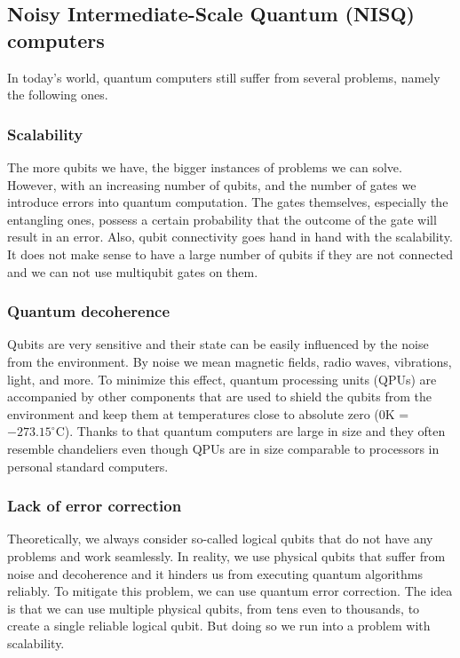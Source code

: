 \subsection{Noisy Intermediate-Scale Quantum (NISQ) computers}
In today's world, quantum computers still suffer from several problems, namely the following ones.

\subsubsection{Scalability}
The more qubits we have, the bigger instances of problems we can solve. However, with an increasing number of qubits, and the number of gates we introduce errors into quantum computation. The gates themselves, especially the entangling ones, possess a certain probability that the outcome of the gate will result in an error. Also, qubit connectivity goes hand in hand with the scalability. It does not make sense to have a large number of qubits if they are not connected and we can not use multiqubit gates on them.

\subsubsection{Quantum decoherence}
Qubits are very sensitive and their state can be easily influenced by the noise from the environment. By noise we mean magnetic fields, radio waves, vibrations, light, and more. To minimize this effect, quantum processing units (QPUs) are accompanied by other components that are used to shield the qubits from the environment and keep them at temperatures close to absolute zero ($0$K = $-273.15^{\circ}$C). Thanks to that quantum computers are large in size and they often resemble chandeliers even though QPUs are in size comparable to processors in personal standard computers.

\subsubsection{Lack of error correction}
Theoretically, we always consider so-called logical qubits that do not have any problems and work seamlessly. In reality, we use physical qubits that suffer from noise and decoherence and it hinders us from executing quantum algorithms reliably. To mitigate this problem, we can use quantum error correction. The idea is that we can use multiple physical qubits, from tens even to thousands, to create a single reliable logical qubit. But doing so we run into a problem with scalability. 

